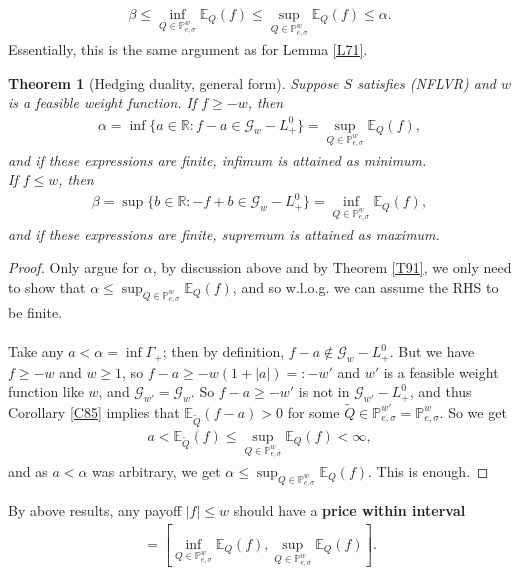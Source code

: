 \documentclass[12pt,a4paper, twoside]{article}
\newtheorem{thm}{Theorem}[section]
\theoremstyle{definition}
\newcommand{\EE}{\mathbb{E}} %
\newcommand{\PP}{\mathbb{P}} %
\begin{document}
\begin{align*}
\beta \leq \inf_{Q \in \PP_{e, \sigma}^w} \EE_Q(f) \leq \sup_{Q \in \PP_{e, \sigma}^w}\EE_Q(f) \leq \alpha.
\end{align*}
Essentially, this is the same argument as for Lemma \ref{L71}. 
\begin{thm}[Hedging duality, general form] \label{T92} Suppose $S$ satisfies (NFLVR) and $w$ is a feasible weight function. If $f \geq -w$, then 
\begin{align*} \label{91}
\alpha = \inf \{ a \in \mathbb{R}: f-a \in \mathcal{G}_w-L_+^0 \} = \sup_{Q \in \PP_{e, \sigma}^w} \EE_Q(f), \tag{9.1}
\end{align*}
and if these expressions are finite, infimum is attained as minimum. \\
If $f \leq w$, then 
\begin{align*}
\beta = \sup\{ b \in \mathbb{R}: -f+b \in \mathcal{G}_w-L_+^0\} = \inf_{Q \in \PP_{e, \sigma}^w} \EE_Q(f),
\end{align*}
and if these expressions are finite, supremum is attained as maximum. 
\end{thm}
\begin{proof}
Only argue for $\alpha$, by discussion above and by Theorem \ref{T91}, we only need to show that $\alpha \leq \sup_{Q \in \PP_{e,  \sigma}^w} \EE_Q(f)$, and so w.l.o.g. we can assume the RHS to be finite. \\
\\
Take any $a< \alpha = \inf \Gamma_+$; then by definition, $f-a \notin \mathcal{G}_w-L_+^0$. But we have $f \geq -w$ and $w \geq 1$, so $f-a \geq -w(1+|a|)=:-w'$ and $w'$ is a feasible weight function like $w$, and $\mathcal{G}_{w'}= \mathcal{G}_{w}$. So $f-a \geq -w' $ is not in $\mathcal{G}_{w'}-L_+^0$, and thus Corollary \ref{C85} implies that $\EE_{\widetilde{Q}}(f-a) >0$ for some $\widetilde{Q} \in \PP_{e, \sigma}^{w'} = \PP_{e, \sigma}^w$. So we get 
\begin{align*}
a < \EE_{ \widetilde{Q}}(f) \leq \sup_{Q \in \PP_{e, \sigma}^w } \EE_Q(f) < \infty,
\end{align*}
and as $a < \alpha$ was arbitrary, we get $\alpha \leq \sup_{Q \in \PP_{e, \sigma}^w} \EE_Q(f)$. This is enough. 
\end{proof}
By above results, any payoff $|f| \leq w$ should have a \textbf{price within interval}
\begin{align*}
[\beta, \alpha ] = \left[  \inf_{Q \in \PP_{e, \sigma}^w} \EE_Q(f), \sup_{Q \in \PP_{e, \sigma}^w } \EE_Q(f) \right].
\end{align*} 
\end{document}
